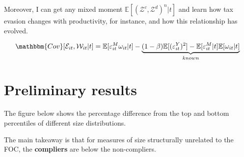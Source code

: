 \documentclass[
  12pt]{article}
\theoremstyle{definition}
\theoremstyle{remark}
\begin{document}
Moreover, I can get any mixed moment
\(\mathbb{E}[(\mathcal{Z}^c, \mathcal{Z}^d)^n|t]\) and learn how tax
evasion changes with productivity, for instance, and how this
relationship has evolved.

\[
\mathbbm{Cov}[\mathcal{E}_{it},\mathcal{W}_{it}|t]=\mathbb{E}[\varepsilon^M_{it}\omega_{it}|t]
-\underbrace{
(1-\beta)\mathbb{E}[(\varepsilon^{Y}_{it})^2]-\mathbb{E}[\varepsilon^M_{it}|t]\mathbb{E}[\omega_{it}|t]}_{
known
}
\]

\hypertarget{preliminary-results}{%
\section{Preliminary results}\label{preliminary-results}}

The figure below shows the percentage difference from the top and bottom
percentiles of different size distributions.

The main takeaway is that for measures of size structurally unrelated to
the FOC, the \textbf{compliers} are below the non-compliers.
\end{document}

